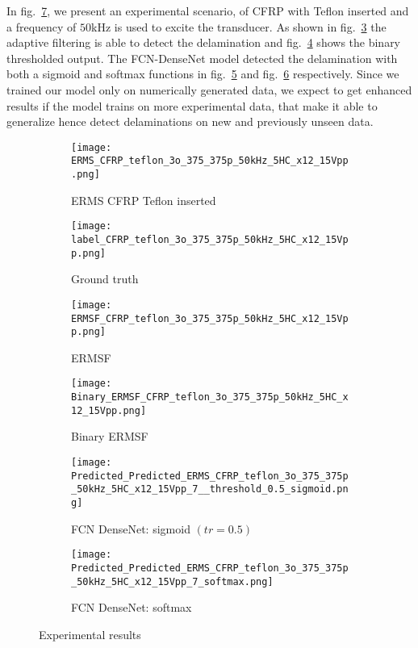 	In fig.~\ref{fig:Exp_ERMS_teflon}, we present an experimental scenario, of CFRP with Teflon inserted and a frequency of \(50\)kHz is used to excite the transducer.
	As shown in fig.~\ref{fig:ERMSF_CFRP_teflon} the adaptive filtering is able to detect the delamination and fig.~\ref{fig:Binary_ERMSF_CFRP} shows the binary thresholded output. 
	The FCN-DenseNet model detected the delamination with both a sigmoid and softmax functions in fig.~\ref{fig:EXP_predict_sigmoid} and fig.~\ref{fig:EXP_predict_softmax} respectively.
	Since we  trained our model only on numerically generated data, 
	we expect to get enhanced results if the model trains on more experimental data, that make it able to generalize hence detect delaminations on new and previously unseen data.
	\begin{figure} [!h]
		\centering
		\begin{subfigure}[b]{0.47\textwidth}
			\centering
			\texttt{[image: ERMS\_CFRP\_teflon\_3o\_375\_375p\_50kHz\_5HC\_x12\_15Vpp.png]}
			\caption{ERMS CFRP Teflon inserted}
			\label{fig:Delamination}
		\end{subfigure}			
		\hfill
		\begin{subfigure}[b]{0.47\textwidth}
			\centering 	
			\texttt{[image: label\_CFRP\_teflon\_3o\_375\_375p\_50kHz\_5HC\_x12\_15Vpp.png]}
			\caption{Ground truth} 
			\label{fig:damage_label}
		\end{subfigure}
		\hfill
		\begin{subfigure}[b]{0.47\textwidth}
			\centering
			\texttt{[image: ERMSF\_CFRP\_teflon\_3o\_375\_375p\_50kHz\_5HC\_x12\_15Vpp.png]}
			\caption{ERMSF} 
			\label{fig:ERMSF_CFRP_teflon}
		\end{subfigure}
		\hfill
		\begin{subfigure}[b]{0.47\textwidth}
		\centering
		\texttt{[image: Binary\_ERMSF\_CFRP\_teflon\_3o\_375\_375p\_50kHz\_5HC\_x12\_15Vpp.png]}
		\caption{Binary ERMSF} 
		\label{fig:Binary_ERMSF_CFRP}
		\end{subfigure}
		\hfill
		\begin{subfigure}[b]{0.47\textwidth}
			\centering
			\texttt{[image: Predicted\_Predicted\_ERMS\_CFRP\_teflon\_3o\_375\_375p\_50kHz\_5HC\_x12\_15Vpp\_7\_\_threshold\_0.5\_sigmoid.png]}
			\caption{FCN DenseNet: sigmoid \((tr = 0.5)\)} 
			\label{fig:EXP_predict_sigmoid}
		\end{subfigure}
		\hfill
		\begin{subfigure}[b]{0.47\textwidth}
			\centering
			\texttt{[image: Predicted\_Predicted\_ERMS\_CFRP\_teflon\_3o\_375\_375p\_50kHz\_5HC\_x12\_15Vpp\_7\_softmax.png]}
			\caption{FCN DenseNet: softmax} 
			\label{fig:EXP_predict_softmax}
		\end{subfigure}
			\caption{Experimental results}
			\label{fig:Exp_ERMS_teflon}
		\end{figure}
\clearpage
	
